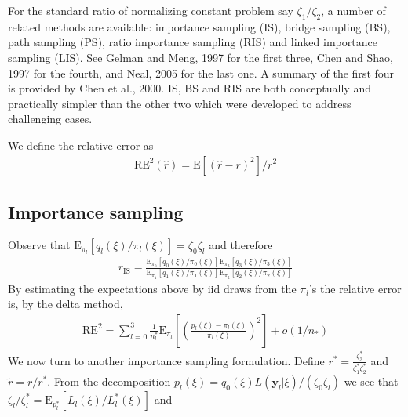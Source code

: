 \documentclass{article}
\begin{document}
For the standard ratio of normalizing constant problem say $\zeta_1/\zeta_2$, a number of related methods are available: importance sampling (IS), bridge sampling (BS), path sampling (PS), ratio importance sampling (RIS) and linked importance sampling (LIS). See Gelman and Meng, 1997 for the first three, Chen and Shao, 1997 for the fourth, and Neal, 2005 for the last one. A summary of the first four is provided by Chen et al., 2000. IS, BS and RIS are both conceptually and practically simpler than the other two which were developed to address challenging cases. 

We define the relative error as
\begin{align}
\mathrm{RE}^2(\hat r)=\mathrm{E}[(\hat r-r)^2]/r^2
\end{align}

\subsection{Importance sampling}
Observe that 
$\mathrm{E}_{\pi_l}[q_l(\xi)/\pi_l(\xi)]=\zeta_0\zeta_l$ and therefore
\begin{align}\label{r_is}
r_{\mathrm{IS}}=\frac{\mathrm{E}_{\pi_0}[q_{0}(\xi)/\pi_0(\xi)]\mathrm{E}_{\pi_3}[q_{3}(\xi)/\pi_3(\xi)]}{\mathrm{E}_{\pi_1}[q_{1}(\xi)/\pi_1(\xi)]\mathrm{E}_{\pi_2}[q_{2}(\xi)/\pi_2(\xi)]}
\end{align}By estimating the expectations above by iid draws from the $\pi_l$'s the relative error is, by the delta method,
\begin{align}
\mathrm{RE}^2= \sum_{l=0}^3\frac{1}{n_l^*}\mathrm{E}_{\pi_l}[\left(\frac{p_{l}(\xi)-{\pi}_l(\xi)}{{\pi}_l(\xi)}\right)^2]+o(1/n_*)
\end{align}
We now turn to another importance sampling formulation. Define $r^*=\frac{\zeta_{3}^*}{\zeta_{1}^*\zeta_{2}^*}$ and $\tilde r=r/r^*$. From the decomposition $p_l(\xi)=q_0(\xi)L(\mathbf{y}_l|\xi)/(\zeta_0 \zeta_l)$ we see that $\zeta_l/\zeta_l^*=\mathrm{E}_{p_l^*}[L_l(\xi)/L_l^*(\xi)]$ and
\end{document}
